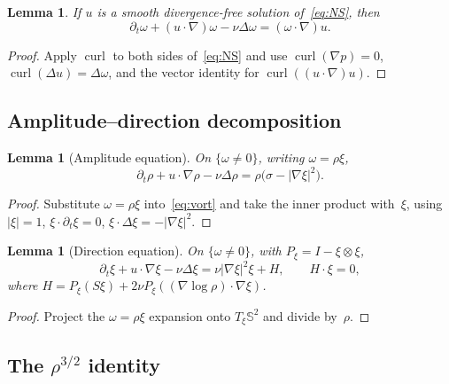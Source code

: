 \documentclass[12pt, reqno]{amsart}
\newtheorem{lemma}[theorem]{Lemma}
\theoremstyle{definition}
\theoremstyle{remark}
\numberwithin{equation}{section}
\newcommand{\Sbb}{\mathbb{S}}
\DeclareMathOperator{\curl}{curl}
\begin{document}
\begin{lemma}\label{lem:vort-eq}
If $u$ is a smooth divergence-free solution of~\eqref{eq:NS}, then
\begin{equation}\label{eq:vort}
\partial_t\omega + (u\cdot\nabla)\omega - \nu\Delta\omega
= (\omega\cdot\nabla)u.
\end{equation}
\end{lemma}
\begin{proof}
Apply $\curl$ to both sides of~\eqref{eq:NS} and use
$\curl(\nabla p)=0$, $\curl(\Delta u)=\Delta\omega$, and the vector
identity for $\curl((u\cdot\nabla)u)$.
\end{proof}

\subsection{Amplitude--direction decomposition}

\begin{lemma}[Amplitude equation]\label{lem:amp}
On $\{\omega\neq 0\}$, writing $\omega=\rho\xi$,
\begin{equation}\label{eq:amp}
\partial_t\rho + u\cdot\nabla\rho - \nu\Delta\rho
= \rho\bigl(\sigma - |\nabla\xi|^2\bigr).
\end{equation}
\end{lemma}
\begin{proof}
Substitute $\omega=\rho\xi$ into~\eqref{eq:vort} and take the inner
product with~$\xi$, using $|\xi|=1$, $\xi\cdot\partial_t\xi=0$,
$\xi\cdot\Delta\xi=-|\nabla\xi|^2$.
\end{proof}

\begin{lemma}[Direction equation]\label{lem:dir}
On $\{\omega\neq 0\}$, with $P_\xi=I-\xi\otimes\xi$,
\begin{equation}\label{eq:dir}
\partial_t\xi + u\cdot\nabla\xi - \nu\Delta\xi
= \nu|\nabla\xi|^2\xi + H,
\qquad H\cdot\xi=0,
\end{equation}
where $H=P_\xi(S\xi)+2\nu P_\xi((\nabla\log\rho)\cdot\nabla\xi)$.
\end{lemma}
\begin{proof}
Project the $\omega=\rho\xi$ expansion onto $T_\xi\Sbb^2$ and divide
by~$\rho$.
\end{proof}

\subsection{The $\rho^{3/2}$ identity}
\end{document}
